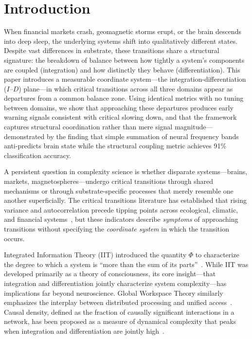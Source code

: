 \documentclass[aip,cha,reprint,amsmath,amssymb,final]{revtex4-2}
\begin{document}
\section{Introduction}

When financial markets crash, geomagnetic storms erupt, or the brain descends into deep sleep, the underlying systems shift into qualitatively different states. Despite vast differences in substrate, these transitions share a structural signature: the breakdown of balance between how tightly a system's components are coupled (integration) and how distinctly they behave (differentiation). This paper introduces a measurable coordinate system---the integration-differentiation ($I$--$D$) plane---in which critical transitions across all three domains appear as departures from a common balance zone. Using identical metrics with no tuning between domains, we show that approaching these departures produces early warning signals consistent with critical slowing down, and that the framework captures structural coordination rather than mere signal magnitude---demonstrated by the finding that simple summation of neural frequency bands anti-predicts brain state while the structural coupling metric achieves 91\% classification accuracy.

A persistent question in complexity science is whether disparate systems---brains, markets, magnetospheres---undergo critical transitions through shared mechanisms or through substrate-specific processes that merely resemble one another superficially. The critical transitions literature has established that rising variance and autocorrelation precede tipping points across ecological, climatic, and financial systems~\cite{scheffer2009,dakos2012}, but these indicators describe \emph{symptoms} of approaching transitions without specifying the \emph{coordinate system} in which the transition occurs.

Integrated Information Theory (IIT) introduced the quantity $\Phi$ to characterize the degree to which a system is ``more than the sum of its parts''~\cite{tononi2016,tononi2004}. While IIT was developed primarily as a theory of consciousness, its core insight---that integration and differentiation jointly characterize system complexity---has implications far beyond neuroscience. Global Workspace Theory similarly emphasizes the interplay between distributed processing and unified access~\cite{baars1988}. Causal density, defined as the fraction of causally significant interactions in a network, has been proposed as a measure of dynamical complexity that peaks when integration and differentiation are jointly high~\cite{seth2011}.
\end{document}
